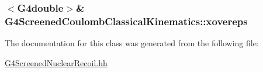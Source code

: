 \subsubsection[{\texorpdfstring{xovereps}{xovereps}}]{$<$G4double$>$\& G4\+Screened\+Coulomb\+Classical\+Kinematics\+::xovereps\hspace{0.3cm}{\ttfamily [protected]}}\hypertarget{classG4ScreenedCoulombClassicalKinematics_addbca9f6d5c2acb2966216b2fab20aea}{}\label{classG4ScreenedCoulombClassicalKinematics_addbca9f6d5c2acb2966216b2fab20aea}


The documentation for this class was generated from the following file\+:\begin{DoxyCompactItemize}
\item 
\hyperlink{G4ScreenedNuclearRecoil_8hh}{G4\+Screened\+Nuclear\+Recoil.\+hh}\end{DoxyCompactItemize}
